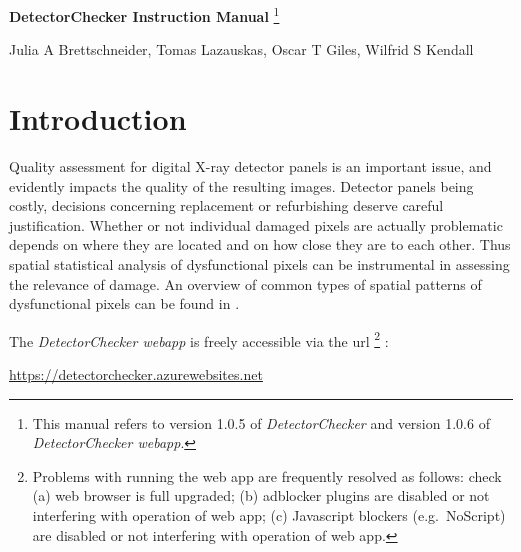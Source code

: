 \documentclass[11pt,a4paper]{article}
\newcommand{\DetectorChecker}{\emph{DetectorChecker}\xspace}
\newcommand{\DetectorCheckerWebApp}{\emph{DetectorChecker webapp}\xspace}
\begin{document}


\begin{center}

{\LARGE\bf DetectorChecker Instruction Manual}
\footnote{This manual refers to version 1.0.5 of \DetectorChecker and version 1.0.6 of \DetectorCheckerWebApp.}


\bigskip
{\large Julia A Brettschneider, Tomas Lazauskas, Oscar T Giles, Wilfrid S Kendall}

\end{center}




\section{Introduction}\label{int}

Quality assessment for digital X-ray detector panels is an important issue, and evidently
impacts the quality of the resulting images. 
Detector panels being costly, 
decisions concerning replacement or refurbishing 
deserve careful justification.
Whether or not individual damaged pixels are actually 
problematic depends on where they are located and 
on how close they are to each other.
Thus spatial statistical analysis of dysfunctional pixels can be 
instrumental in assessing the relevance of damage.
An overview of 
common types of spatial patterns of dysfunctional pixels can be found in \cite{brettschneider2014crism}. 

The \DetectorCheckerWebApp is freely accessible via the url \footnote{
	Problems with running the web app are frequently resolved as follows: check (a) web browser is full upgraded; (b) adblocker plugins are disabled or not interfering with operation of web app; (c) Javascript blockers (e.g.~NoScript) are disabled or not interfering with operation of web app.}
:

\begin{mdframed}
	\bigskip
	\centerline{
		{\large
			\url{https://detectorchecker.azurewebsites.net}
		}
	}
	\medskip
\end{mdframed}
\end{document}
